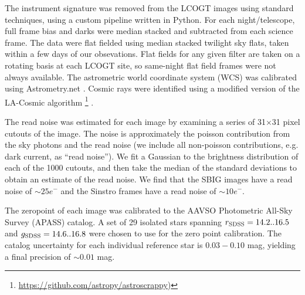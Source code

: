 \documentclass[iop]{emulateapj}
\begin{document}
The instrument signature was removed from the LCOGT images using
standard techniques, using a custom pipeline written in Python. For
each night/telescope, full frame bias and darks were median stacked
and subtracted from each science frame. The data were flat fielded
using median stacked twilight sky flats, taken within a few days of
our obsevations. Flat fields for any given filter are taken on a
rotating basis at each LCOGT site, so same-night flat field frames
were not always available. The astrometric world coordinate system
(WCS) was calibrated using Astrometry.net \citep{Lang10}. Cosmic rays
were identified using a modified version of the LA-Cosmic algorithm
\footnote{\url{https://github.com/astropy/astroscrappy})}
\citep{vanDokkum01}.
	
The read noise was estimated for each image by examining a series of
31$\times$31 pixel cutouts of the image. The noise is approximately
the poisson contribution from the sky photons and the read noise (we
include all non-poisson contributions, e.g. dark current, as ``read
noise''). We fit a Gaussian to the brightness distribution of each of
the 1000 cutouts, and then take the median of the standard deviations
to obtain an estimate of the read noise. We find that the SBIG images
have a read noise of $\sim 25 e^{-}$ and the Sinstro frames have a
read noise of $\sim 10 e^{-}$.
	
 
The zeropoint of each image was calibrated to the AAVSO Photometric
All-Sky Survey (APASS) catalog. A set of 29 isolated stars spanning
$r_{\rm{SDSS}} =14.2..16.5$ and $g_{\rm{SDSS}} = 14.6..16.8$ were
chosen to use for the zero point calibration.  The catalog uncertainty
for each individual reference star is $0.03-0.10$ mag, yielding a
final precision of $\sim 0.01$ mag.
	

\end{document}
